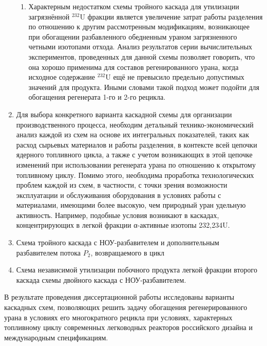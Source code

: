 \begin{enumerate}
\begin{enumerate}
   \item Характерным недостатком схемы тройного каскада для утилизации загрязнённой $^{232}$U фракции является увеличение затрат работы разделения по отношению к другим рассмотренным модификациям, возникающее при обогащении разбавленного обедненным ураном загрязненного четными изотопами отхода. Анализ результатов серии вычислительных экспериментов, проведенных для данной схемы позволяет говорить, что она хорошо применима для составов регенированного урана, когда исходное содержание $^{232}$U ещё не превысило предельно допустимых значений для продукта. Иными словами такой подход может подойти для обогащения регенерата 1-го и 2-го рецикла.
  
\end{enumerate}
\item Для выбора конкретного варианта каскадной схемы для организации производственного
процесса, необходим детальный технико-экономический анализ
каждой из схем на основе их интегральных показателей, таких как расход сырьевых
материалов и работы разделения, в контексте всей цепочки ядерного
топливного цикла, а также с учетом возникающих в этой цепочке изменений при
использовании регенерата урана по отношению к открытому топливному циклу.
Помимо этого, необходима проработка технологических проблем каждой из
схем, в частности, с точки зрения возможности эксплуатации и обслуживания
оборудования в условиях работы с материалами, имеющими более высокую, чем
природный уран удельную активность. Например, подобные условия возникают
в каскадах, концентрирующих в легкой фракции α-активные изотопы 232,234U.
  
  
  
  \item Схема тройного каскада с НОУ-разбавителем и дополнительным разбавителем потока $P_2$, возвращаемого в цикл
  \item Схема независимой утилизации побочного продукта легкой фракции второго каскада схемы двойного каскада с НОУ-разбавителем.
\end{enumerate}











В результате проведения диссертационной работы исследованы варианты каскадных схем, позволяющих решить задачу обогащения регенерированного урана в условиях его многократного рецикла при условиях, характерных топливному циклу современных легководных реакторов российского дизайна и международным спецификациям.

